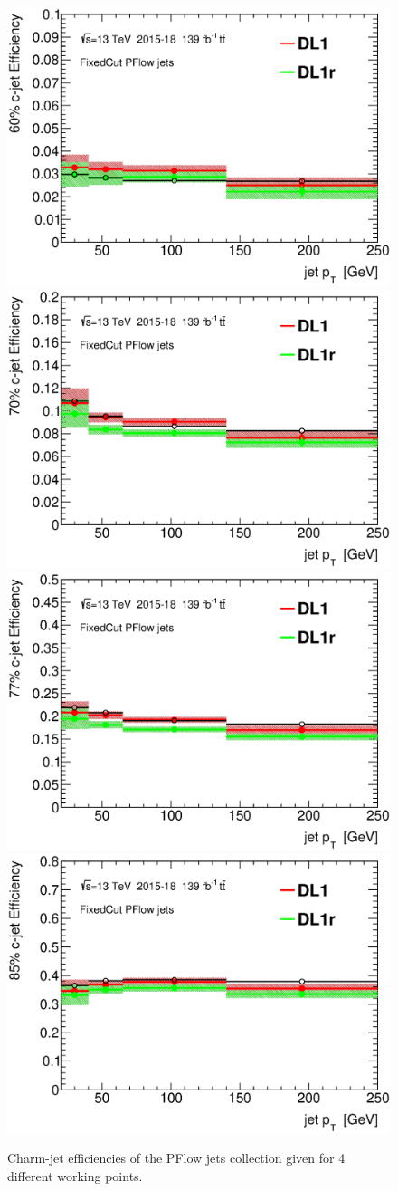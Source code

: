 \documentclass[letterpaper,12pt]{article}
\begin{document}
\begin{figure}[H]
\includegraphics[width=.45\textwidth]{SFplots_december/DL1allPFlowDec_DL1rallPFlowDec/eff60.eps}
\includegraphics[width=.45\textwidth]{SFplots_december/DL1allPFlowDec_DL1rallPFlowDec/eff70.eps}\\
\includegraphics[width=.45\textwidth]{SFplots_december/DL1allPFlowDec_DL1rallPFlowDec/eff77.eps}
\includegraphics[width=.45\textwidth]{SFplots_december/DL1allPFlowDec_DL1rallPFlowDec/eff85.eps}\\
\caption{Charm-jet efficiencies of the PFlow jets collection 
given for 4 different working points.} \label{fig:Dec_eff_PFlow}
\end{figure}
\end{document}
